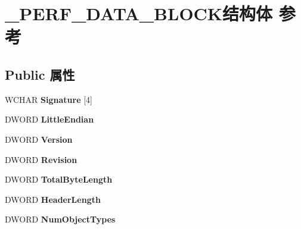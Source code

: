 \hypertarget{struct___p_e_r_f___d_a_t_a___b_l_o_c_k}{}\section{\+\_\+\+P\+E\+R\+F\+\_\+\+D\+A\+T\+A\+\_\+\+B\+L\+O\+C\+K结构体 参考}
\label{struct___p_e_r_f___d_a_t_a___b_l_o_c_k}
\subsection*{Public 属性}
\begin{DoxyCompactItemize}
\item 
\mbox{\label{struct___p_e_r_f___d_a_t_a___b_l_o_c_k_af4230493fca5b0da89d4a8794ac08ba4}} 
W\+C\+H\+AR {\bfseries Signature} \mbox{[}4\mbox{]}
\item 
\mbox{\label{struct___p_e_r_f___d_a_t_a___b_l_o_c_k_ab852dae82fa132aeba4db0eb83baf6a0}} 
D\+W\+O\+RD {\bfseries Little\+Endian}
\item 
\mbox{\label{struct___p_e_r_f___d_a_t_a___b_l_o_c_k_ab2461757ec83566e59672dcaa51eb8c3}} 
D\+W\+O\+RD {\bfseries Version}
\item 
\mbox{\label{struct___p_e_r_f___d_a_t_a___b_l_o_c_k_a3c9dc3964b61cd5500e1f141a7d7e481}} 
D\+W\+O\+RD {\bfseries Revision}
\item 
\mbox{\label{struct___p_e_r_f___d_a_t_a___b_l_o_c_k_afb0a1dc935c61a87d3d722c459f55bb4}} 
D\+W\+O\+RD {\bfseries Total\+Byte\+Length}
\item 
\mbox{\label{struct___p_e_r_f___d_a_t_a___b_l_o_c_k_a2d00de78d8d5bd2992edd956f97c1731}} 
D\+W\+O\+RD {\bfseries Header\+Length}
\item 
\mbox{\label{struct___p_e_r_f___d_a_t_a___b_l_o_c_k_acd8640915adf47147e4b2fe7932c401a}} 
D\+W\+O\+RD {\bfseries Num\+Object\+Types}
\item 
\mbox{\label{struct___p_e_r_f___d_a_t_a___b_l_o_c_k_a313fc7720c1dd99f17624467f1628687}} 

\end{DoxyCompactItemize}
